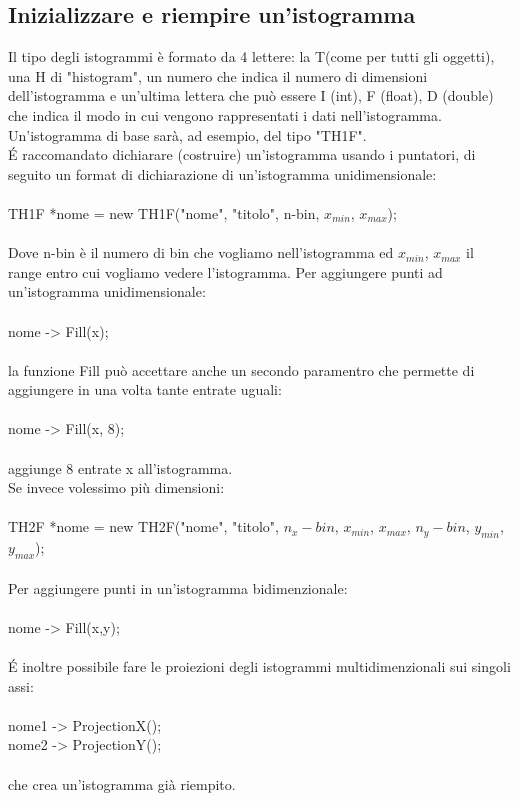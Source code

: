 \documentclass[10pt,a4paper]{article}
\begin{document}
\subsection{Inizializzare e riempire un'istogramma}
Il tipo degli istogrammi è formato da 4 lettere: la T(come per tutti gli oggetti), una H di "histogram", un numero che indica il numero di dimensioni dell'istogramma e un'ultima lettera che può essere I (int), F (float), D (double) che indica il modo in cui vengono rappresentati i dati nell'istogramma. Un'istogramma di base sarà, ad esempio, del tipo "TH1F".\\
\'{E} raccomandato dichiarare (costruire) un'istogramma usando i puntatori, di seguito un format di dichiarazione di un'istogramma unidimensionale:\\\\
TH1F *nome = new TH1F("nome", "titolo", n-bin, \(x_{min}\), \(x_{max}\)); \\\\
Dove n-bin è il numero di bin che vogliamo nell'istogramma ed \(x_{min}\), \(x_{max}\) il range entro cui vogliamo vedere l'istogramma. Per aggiungere punti ad un'istogramma unidimensionale:\\\\
nome -> Fill(x);\\\\
la funzione Fill può accettare anche un secondo paramentro che permette di aggiungere in una volta tante entrate uguali:\\\\
nome -> Fill(x, 8);\\\\
aggiunge 8 entrate x all'istogramma.\\
Se invece volessimo più dimensioni:\\\\
TH2F *nome = new TH2F("nome", "titolo", \(n_x-bin\), \(x_{min}\), \(x_{max}\), \(n_y-bin\), \(y_{min}\), \(y_{max}\)); \\\\
Per aggiungere punti in un'istogramma bidimenzionale:\\\\
nome -> Fill(x,y);\\\\
\'{E} inoltre possibile fare le proiezioni degli istogrammi multidimenzionali sui singoli assi:\\\\
nome1 -> ProjectionX();\\
nome2 -> ProjectionY();\\\\
che crea un'istogramma già riempito.\\
\end{document}
